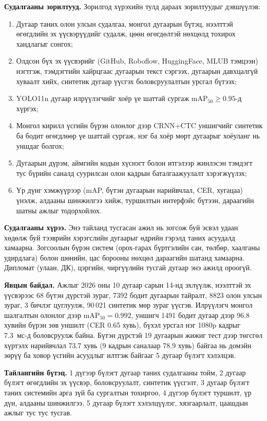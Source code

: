 \textbf{Судалгааны зорилтууд.} Зорилгод хүрэхийн тулд дараах зорилтуудыг дэвшүүлэв:
\begin{enumerate}[leftmargin=2.5em]
\item Дугаар таних олон улсын судалгаа, монгол дугаарын бүтэц, нээлттэй өгөгдлийн эх үүсвэрүүдийг судалж, цөөн өгөгдөлтэй нөхцөлд тохирох хандлагыг сонгох;
\item Олдсон бүх эх үүсвэрийг (GitHub, Roboflow, HuggingFace, MLUB тэмцээн) нэгтгэж, тэмдэгтийн хайрцгаас дугаарын текст сэргээх, дугаарын давхцалгүй хуваалт хийх, синтетик дугаар үүсгэх боловсруулалтын урсгал бүтээх;
\item YOLO11n дугаар илрүүлэгчийг хоёр үе шаттай сургаж mAP$_{50}\ge0.95$-д хүргэх;
\item Монгол кирилл үсгийн бүрэн олонлог дээр CRNN+CTC уншигчийг синтетик ба бодит өгөгдлөөр үе шаттай сургаж, нэг ба хоёр мөрт дугаарыг хоёуланг нь уншдаг болгох;
\item Дугаарын дүрэм, аймгийн кодын хүснэгт болон итгэлээр жинлэсэн тэмдэгт тус бүрийн саналд суурилсан олон кадрын баталгаажуулалт хэрэгжүүлэх;
\item Үр дүнг хэмжүүрээр (mAP, бүтэн дугаарын нарийвчлал, CER, хугацаа) үнэлж, алдааны шинжилгээ хийж, туршилтын интерфэйс бүтээн, дараагийн шатны ажлыг тодорхойлох.
\end{enumerate}

\textbf{Судалгааны хүрээ.} Энэ тайланд тусгасан ажил нь зогсож буй эсвэл удаан хөдөлж буй тээврийн хэрэгслийн дугаарыг өдрийн гэрэлд таних асуудалд хамаарна. Зогсоолын бүрэн систем (орох-гарах бүртгэлийн сан, төлбөр, хаалганы удирдлага) болон шөнийн, цас борооны нөхцөл дараагийн шатанд хамаарна. Дипломат (улаан, ДК), цэргийн, чиргүүлийн тусгай дугаар энэ ажилд ороогүй.

\textbf{Явцын байдал.} Ажлыг 2026 оны 10 дугаар сарын 14-нд эхлүүлж, нээлттэй эх үүсвэрээс 68 бүтэн дүрстэй зураг, 7392 бодит дугаарын тайралт, 8823 олон улсын зураг, 3 бичлэг цуглуулж, 90\,021 синтетик мөр зураг үүсгэв. Илрүүлэгч монгол шалгалтын олонлог дээр mAP$_{50}=0.992$, уншигч 1491 бодит дугаар дээр 96.8 хувийн бүрэн зөв уншилт (CER 0.65 хувь), бүхэл урсгал нэг 1080p кадрыг 7.3~мс-д боловсруулж байна. Бүтэн дүрстэй 19 дугаарын жижиг тест дээр төгсгөл хүртэлх нарийвчлал 73.7 хувь (9 кадрын саналаар 78.9 хувь) байгаа нь домэйн зөрүү ба ховор үсгийн асуудлыг илтгэж байгааг 5 дугаар бүлэгт хэлэлцэв.

\textbf{Тайлангийн бүтэц.} 1 дүгээр бүлэгт дугаар таних судалгааны тойм, 2 дугаар бүлэгт өгөгдлийн эх үүсвэр, боловсруулалт, синтетик үүсгэлт, 3 дугаар бүлэгт таних системийн арга зүй ба сургалтын тохиргоо, 4 дүгээр бүлэгт туршилт, үр дүн, алдааны шинжилгээ, 5 дугаар бүлэгт хэлэлцүүлэг, хязгаарлалт, цаашдын ажлыг тус тус тусгав.
